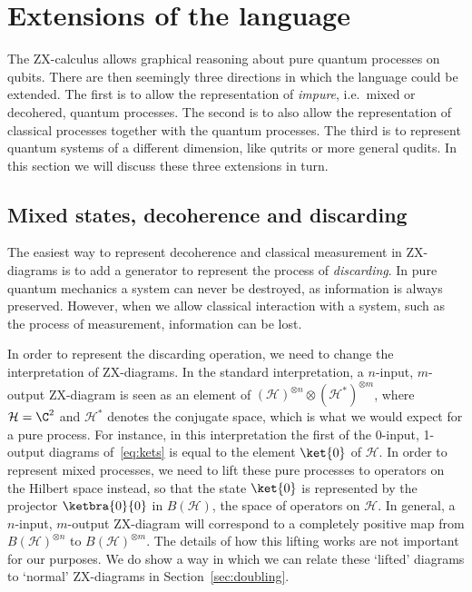 \documentclass[a4paper,onecolumn,superscriptaddress,11pt,%
				unpublished,%
				allowfontchageintitle,%
				]{quantumarticle}
\begin{document}
\section{Extensions of the language}\label{sec:extensions}

The ZX-calculus allows graphical reasoning about pure quantum processes on qubits. There are then seemingly three directions in which the language could be extended. The first is to allow the representation of \emph{impure}, i.e.~mixed or decohered, quantum processes. The second is to also allow the representation of classical processes together with the quantum processes. The third is to represent quantum systems of a different dimension, like qutrits or more general qudits.
In this section we will discuss these three extensions in turn.

\subsection{Mixed states, decoherence and discarding}\label{sec:mixed-state}

The easiest way to represent decoherence and classical measurement in ZX-diagrams is to add a generator to represent the process of \emph{discarding}. In pure quantum mechanics a system can never be destroyed, as information is always preserved. However, when we allow classical interaction with a system, such as the process of measurement, information can be lost.

In order to represent the discarding operation, we need to change the interpretation of ZX-diagrams. In the standard interpretation, a $n$-input, $m$-output ZX-diagram is seen as an element of $(\mathcal H)^{\otimes n}\otimes (\mathcal H^*)^{\otimes m}$, where $\mathcal H = \C^2$ and $\mathcal H^*$ denotes the conjugate space, which is what we would expect for a pure process.
For instance, in this interpretation the first of the 0-input, 1-output diagrams of~\eqref{eq:kets} is equal to the element $\ket{0}$ of $\mathcal H$.
In order to represent mixed processes, we need to lift these pure processes to operators on the Hilbert space instead, so that the state $\ket{0}$ is represented by the projector $\ketbra{0}{0}$ in $B(\mathcal H)$, the space of operators on $\mathcal H$. 
In general, a $n$-input, $m$-output ZX-diagram will correspond to a completely positive map from $B(\mathcal H)^{\otimes n}$ to $B(\mathcal H)^{\otimes m}$. The details of how this lifting works are not important for our purposes. We do show a way in which we can relate these `lifted' diagrams to `normal' ZX-diagrams in Section~\ref{sec:doubling}.
\end{document}
